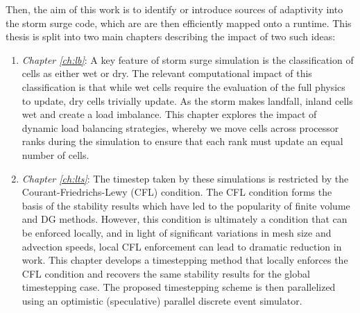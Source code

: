 Then, the aim of this work is to identify or introduce sources of adaptivity into the storm surge code, which are are then efficiently mapped onto a runtime. This thesis is split into two main chapters describing the impact of two such ideas:
\begin{enumerate}
\item {\em Chapter \ref{ch:lb}}: A key feature of storm surge simulation is the classification of cells as either wet or dry. The relevant computational impact of this classification is that while wet cells require the evaluation of the full physics to update, dry cells trivially update. As the storm makes landfall, inland cells wet and create a load imbalance. This chapter explores the impact of dynamic load balancing strategies, whereby we move cells across processor ranks during the simulation to ensure that each rank must update an equal number of cells.
\item {\em Chapter \ref{ch:lts}}: The timestep taken by these simulations is restricted by the Courant-Friedrichs-Lewy (CFL) condition. The CFL condition forms the basis of the stability results which have led to the popularity of finite volume and DG methods. However, this condition is ultimately a condition that can be enforced locally, and in light of significant variations in mesh size and advection speeds, local CFL enforcement can lead to dramatic reduction in work. This chapter develops a timestepping method that locally enforces the CFL condition and recovers the same stability results for the global timestepping case. The proposed timestepping scheme is then parallelized using an optimistic (speculative) parallel discrete event simulator.
\end{enumerate}